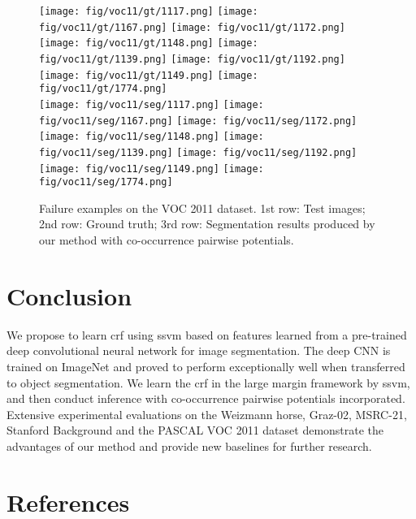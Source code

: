 \documentclass[10pt,3p]{elsarticle}
\newcommand{\ssvm}{{\sc ssvm}\xspace}
\newcommand{\crf}{{\sc crf}\xspace}
\begin{document}
\begin{figure}[!t]
	\texttt{[image: fig/voc11/gt/1117.png]}
     \texttt{[image: fig/voc11/gt/1167.png]}     
	\texttt{[image: fig/voc11/gt/1172.png]}
     \texttt{[image: fig/voc11/gt/1148.png]}
     \texttt{[image: fig/voc11/gt/1139.png]} 
     \texttt{[image: fig/voc11/gt/1192.png]}  
     \texttt{[image: fig/voc11/gt/1149.png]} 
     \texttt{[image: fig/voc11/gt/1774.png]}\\
 
       
     \texttt{[image: fig/voc11/seg/1117.png]}
     \texttt{[image: fig/voc11/seg/1167.png]}     
	\texttt{[image: fig/voc11/seg/1172.png]}
     \texttt{[image: fig/voc11/seg/1148.png]}
     \texttt{[image: fig/voc11/seg/1139.png]} 
     \texttt{[image: fig/voc11/seg/1192.png]}  
     \texttt{[image: fig/voc11/seg/1149.png]} 
     \texttt{[image: fig/voc11/seg/1774.png]}\\


\caption{Failure examples on the VOC 2011 dataset. 1st row: Test images; 2nd row: Ground truth; 
3rd row: Segmentation results produced by our method with co-occurrence pairwise potentials. }
    \label{fig:seg_voc11_fail}      
\end{figure}




\section{Conclusion}
We propose to learn \crf using \ssvm based on features learned from a pre-trained deep convolutional neural network for image segmentation.
The deep CNN is trained on ImageNet and proved to perform exceptionally well when transferred to object segmentation.
We learn the \crf in the large margin framework by \ssvm,
and then conduct inference with co-occurrence pairwise potentials incorporated.
Extensive experimental evaluations on the Weizmann horse, Graz-02, MSRC-21, Stanford Background and the PASCAL VOC 2011 dataset demonstrate the advantages of our method and provide new baselines for further research.




\section*{References}




\end{document}
